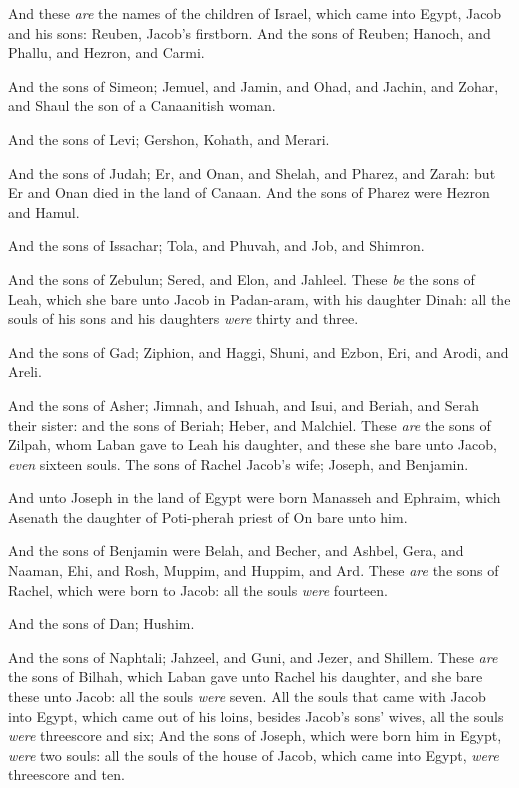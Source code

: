 \documentclass[11pt,letterpaper,oneside]{memoir}
\begin{document}
And these \emph{are} the names of the children of Israel, which came
into Egypt, Jacob and his sons: Reuben, Jacob's firstborn. And the sons
of Reuben; Hanoch, and Phallu, and Hezron, and Carmi.

And the sons of Simeon; Jemuel, and Jamin, and Ohad, and Jachin, and
Zohar, and Shaul the son of a Canaanitish woman.

And the sons of Levi; Gershon, Kohath, and Merari.

And the sons of Judah; Er, and Onan, and Shelah, and Pharez, and Zarah:
but Er and Onan died in the land of Canaan. And the sons of Pharez were
Hezron and Hamul.

And the sons of Issachar; Tola, and Phuvah, and Job, and Shimron.

And the sons of Zebulun; Sered, and Elon, and Jahleel. These \emph{be}
the sons of Leah, which she bare unto Jacob in Padan-aram, with his
daughter Dinah: all the souls of his sons and his daughters \emph{were}
thirty and three.

And the sons of Gad; Ziphion, and Haggi, Shuni, and Ezbon, Eri, and
Arodi, and Areli.

And the sons of Asher; Jimnah, and Ishuah, and Isui, and Beriah, and
Serah their sister: and the sons of Beriah; Heber, and Malchiel. These
\emph{are} the sons of Zilpah, whom Laban gave to Leah his daughter, and
these she bare unto Jacob, \emph{even} sixteen souls. The sons of Rachel
Jacob's wife; Joseph, and Benjamin.

And unto Joseph in the land of Egypt were born Manasseh and Ephraim,
which Asenath the daughter of Poti-pherah priest of On bare unto him.

And the sons of Benjamin were Belah, and Becher, and Ashbel, Gera, and
Naaman, Ehi, and Rosh, Muppim, and Huppim, and Ard. These \emph{are} the
sons of Rachel, which were born to Jacob: all the souls \emph{were}
fourteen.

And the sons of Dan; Hushim.

And the sons of Naphtali; Jahzeel, and Guni, and Jezer, and Shillem.
These \emph{are} the sons of Bilhah, which Laban gave unto Rachel his
daughter, and she bare these unto Jacob: all the souls \emph{were}
seven. All the souls that came with Jacob into Egypt, which came out of
his loins, besides Jacob's sons' wives, all the souls \emph{were}
threescore and six; And the sons of Joseph, which were born him in
Egypt, \emph{were} two souls: all the souls of the house of Jacob, which
came into Egypt, \emph{were} threescore and ten.
\end{document}
